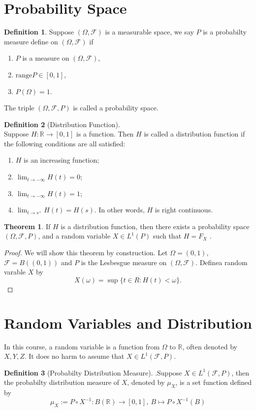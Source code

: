 \documentclass[12pt]{book}
\theoremstyle{definition}
\newtheorem{definition}{Definition}[chapter]
\newtheorem{theorem}{Theorem}[chapter]
\newcommand{\R}{\mathbb{R}}
\begin{document}
\section{Probability Space}
\begin{definition}Suppose $(\Omega,\mathcal F)$ is a measurable space, we say $P$ is a probabilty measure define on $(\Omega,\mathcal F)$ if 
\begin{enumerate}
	\item $P$ is a measure on $(\Omega,\mathcal F)$,
	\item $\mathrm{range}P \in [0,1]$,
	\item $P(\Omega)=1$.
\end{enumerate}
The triple $(\Omega,\mathcal F,P)$ is called a probability space.
\end{definition}

\begin{definition}[Distribution Function] \ \\
Suppose $H:\R \to [0,1]$ is a function. Then $H$ is called a distribution function if the following conditions are all satisfied:
\begin{enumerate}
	\item $H$ is an increasing function;
	\item $\lim_{t \to -\infty}H(t)=0$;
	\item $\lim_{t \to -\infty}H(t)=1$;
	\item $\lim_{t \to s^+}H(t)=H(s)$. In other words, $H$ is right continuous.
\end{enumerate}
\end{definition}

\begin{theorem}
If $H$ is a distribution function, then there exists a probability space $(\Omega,\mathcal F,P)$, and a random variable $X \in L^1(P)$ such that $H=F_X$	.
\end{theorem}
\begin{proof}
We will show this theorem by construction. Let $\Omega=(0,1)$, $\mathcal F=B((0,1))$ and $P$ is the Lesbesgue measure on $(\Omega,\mathcal F)$. Definea random varable $X$ by
$$
X(\omega)= \sup \{t\in R: H(t)<\omega \}.
$$
\end{proof}






\section{Random Variables and Distribution}
In this course, a random variable is a function from $\Omega$ to $\R$, often denoted by $X,Y,Z$. It does no harm to assume that $X \in L^1(\mathcal F,P)$.
\begin{definition}[Probabilty Distribution Measure].\label{PDM}
Suppose $X \in L^1(\mathcal F,P)$, then the probabilty distribution measure of $X$, denoted by $\mu_X$, is a set function defined by
$$
\mu_X := P \circ X^{-1}: B(\R) \to [0,1],\ B \mapsto P \circ X^{-1}(B)
$$
\end{definition}
\end{document}
